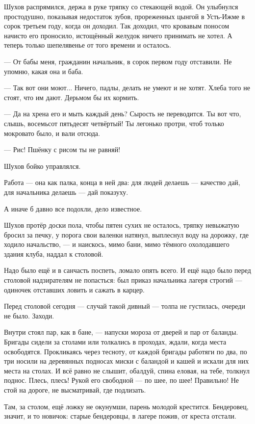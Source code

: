 Шухов распрямился, держа в руке тряпку со стекающей водой. Он улыбнулся простодушно,
показывая недостаток зубов, прореженных цынгой в Усть-Ижме в сорок третьем году, когда он
доходил. Так доходил, что кровавым поносом начисто его проносило, истощённый желудок ничего
принимать не хотел. А теперь только шепелявенье от того времени и осталось.

--- От бабы меня, гражданин начальник, в сорок первом году отставили. Не упомню, какая она и
баба.

--- Так вот они моют... Ничего, падлы, делать не умеют и не хотят. Хлеба того не стоят, что им
дают. Дерьмом бы их кормить.

--- Да на хрена его и мыть каждый день? Сырость не переводится. Ты вот что, слышь, восемьсот
пятьдесят четвёртый! Ты легонько протри, чтоб только мокровато было, и вали отсюда.

--- Рис! Пшёнку с рисом ты не равняй!

Шухов бойко управлялся.

Работа --- она как палка, конца в ней два: для людей делаешь --- качество дай, для начальника
делаешь --- дай показуху.

А иначе б давно все подохли, дело известное.

Шухов протёр доски пола, чтобы пятен сухих не осталось, тряпку невыжатую бросил за печку, у
порога свои валенки натянул, выплеснул воду на дорожку, где ходило начальство, --- и наискось,
мимо бани, мимо тёмного охолодавшего здания клуба, наддал к столовой.

Надо было ещё и в санчасть поспеть, ломало опять всего. И ещё надо было перед столовой
надзирателям не попасться: был приказ начальника лагеря строгий --- одиночек отставших
ловить и сажать в карцер.

Перед столовой сегодня --- случай такой дивный --- толпа не густилась, очереди не было. Заходи.

Внутри стоял пар, как в бане, --- напуски мороза от дверей и пар от баланды. Бригады сидели за
столами или толкались в проходах, ждали, когда места освободятся. Прокликаясь через тесноту,
от каждой бригады работяги по два, по три носили на деревянных подносах миски с баландой и
кашей и искали для них места на столах. И всё равно не слышит, обалдуй, спина еловая, на тебе,
толкнул поднос. Плесь, плесь! Рукой его свободной --- по шее, по шее! Правильно! Не стой на
дороге, не высматривай, где подлизать.

Там, за столом, ещё ложку не окунумши, парень молодой крестится. Бендеровец, значит, и то
новичок: старые бендеровцы, в лагере пожив, от креста отстали.

